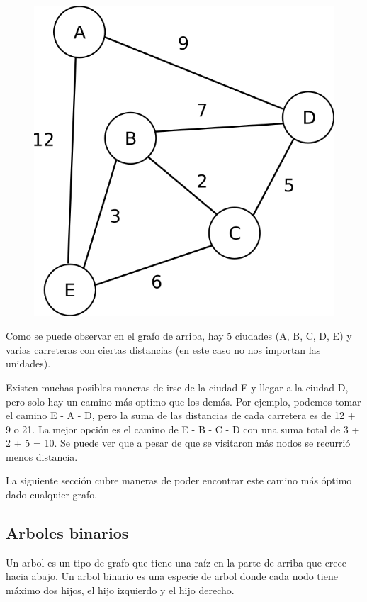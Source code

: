\documentclass{article}
\begin{document}
\begin{figure}[H]
    \centering
    \includegraphics[width=0.2\paperwidth]{ciudades}
\end{figure}

Como se puede observar en el grafo de arriba, hay 5 ciudades (A, B, C, D, E) y varias carreteras con ciertas distancias (en este caso no nos importan las unidades).

Existen muchas posibles maneras de irse de la ciudad E y llegar a la ciudad D, pero solo hay un camino más optimo que los demás. Por ejemplo, podemos tomar el camino E - A - D, pero la suma de las distancias de cada carretera es de 12 + 9 o 21. La mejor opción es el camino de E - B - C - D con una suma total de 3 + 2 + 5 = 10. Se puede ver que a pesar de que se visitaron más nodos se recurrió menos distancia.

La siguiente sección cubre maneras de poder encontrar este camino más óptimo dado cualquier grafo.

\subsection{Arboles binarios}

Un arbol es un tipo de grafo que tiene una raíz en la parte de arriba que crece hacia abajo. Un arbol binario es una especie de arbol donde cada nodo tiene máximo dos hijos, el hijo izquierdo y el hijo derecho.
\end{document}
